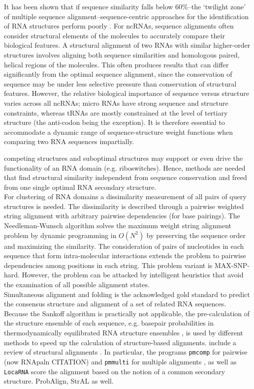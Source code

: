 \documentclass[a4paper,11pt]{article}
\newcommand\pmcomp{\texttt{pmcomp}}
\newcommand\pmmulti{\texttt{pmmulti}}
\newcommand\locarna{\texttt{LocaRNA}}
\begin{document}
It has been shown that if sequence similarity falls below 60\%--the 
`twilight zone' of multiple sequence alignment--sequence-centric approaches 
for the identification of RNA structures perform poorly  \cite{Gardner15860779}.
For ncRNAs, sequence alignments often consider structural elements of
the molecules to accurately compare their biological features. A structural 
alignment of two RNAs with similar higher-order structures 
involves aligning both sequence similarities and homologous paired,
helical regions of the molecules. This often produces results that 
can differ significantly from the optimal sequence alignment, since 
the conservation of sequence may be under less selective pressure than 
conservation of structural features. However, the relative biological 
importance of sequence versus structure
varies across all ncRNAs; micro RNAs have strong sequence and structure constraints, 
whereas tRNAs are mostly constrained at the level of tertiary structure
(the anti-codon being the exception). It is therefore essential to 
accommodate a dynamic range of sequence-structure weight functions 
when comparing two RNA sequences impartially.

competing structures and
suboptimal structures may support or even drive the functionality of an RNA
domain (e.g.  riboswitches). Hence, methods are needed that find structural similarity independent
from sequence conservation and freed from one single optimal RNA secondary
structure.\\

For clustering of RNA domains a dissimilarity measurement of all pairs of query
structures is needed. The dissimilarity is described through a pairwise weighted
string alignment with arbitrary pairwise dependencies (for base pairings). The
Needleman-Wunsch algorithm solves the maximum weight string alignment
problem by dynamic programming in $O(N^2)$ by preserving the sequence order and
maximizing the similarity. The consideration of pairs of nucleotides in each
sequence that form intra-molecular interactions extends the problem to pairwise
dependencies among positions in each string. This problem variant is
MAX-SNP-hard. However, the problem can be attacked by intelligent heuristics
that avoid the examination of all possible alignment states.\\

Simultaneous alignment and folding \cite{sankoff85} is the acknowledged gold
standard to predict the consensus structure and alignment of a set of related
RNA sequences. Because the Sankoff algorithm is practically not applicable, the
pre-calculation of the structure ensemble of each sequence, e.g. basepair
probabilities in thermodynamically equilibrated RNA structure ensembles
\cite{McCaskill:1990}, is used by different methods to speed up the calculation
of structure-based alignments. {\color{red} include a review of structural alignments }. 
In particular, the programs \pmcomp{} for pairwise (now RNApaln {\color{red}CITATION}) and
\pmmulti{} for multiple alignments \cite{Hofacker15073017}, as well as
\locarna{} \cite{Will17432929} score the alignment based on the notion of a
common secondary structure. {\color{red}ProbAlign, StrAL as well}. \\
\end{document}
